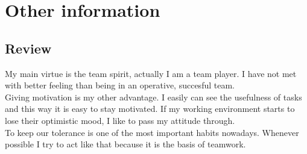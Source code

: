 \documentclass[letterpaper]{twentysecondcv}
\begin{document}

\section{Other information}

\subsection{Review}

My main virtue is the team spirit, actually I am a team player. I have not met with better feeling than being in an operative, succesful team. \\Giving motivation is my other advantage. I easily can see the usefulness of tasks and this way it is easy to stay motivated. If my working environment starts to lose their optimistic mood, I like to pass my attitude through. \\To keep our tolerance is one of the most important habits nowadays. Whenever possible I try to act like that because it is the basis of teamwork.
\end{document}
